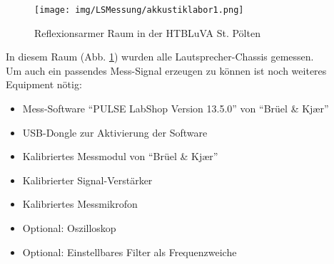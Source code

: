 \newpage
\begin{figure} [H]
	\centering
	\texttt{[image: img/LSMessung/akkustiklabor1.png]}
	\caption{Reflexionsarmer Raum in der HTBLuVA St. Pölten}
	\label{fig:4.1.1}
\end{figure}
In diesem Raum (Abb. \ref{fig:4.1.1}) wurden alle Lautsprecher-Chassis gemessen.\\
Um auch ein passendes Mess-Signal erzeugen zu können ist noch weiteres Equipment nötig:
\begin{itemize}
	\item Mess-Software \enquote{PULSE LabShop Version 13.5.0} von \enquote{Brüel \& Kj\ae r}
	\item USB-Dongle zur Aktivierung der Software
	\item Kalibriertes Messmodul von \enquote{Brüel \& Kj\ae r}
	\item Kalibrierter Signal-Verstärker
	\item Kalibriertes Messmikrofon
	\item Optional: Oszilloskop
	\item Optional: Einstellbares Filter als Frequenzweiche
\end{itemize}

\newpage
